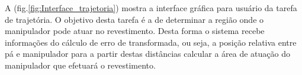 \documentclass[12pt,a4paper]{article}
\begin{document}
A (fig.\ref{fig:Interface_trajetoria}) mostra a interface gráfica para usuário
da tarefa de trajetória. O objetivo desta tarefa é a de determinar a região onde
o manipulador pode atuar no revestimento. Desta forma o sistema recebe
informações do cálculo de erro de transformada, ou seja, a posição relativa
entre pá e manipulador para a partir destas distâncias calcular a área de
atuação do manipulador que efetuará o revestimento.


 
\end{document}
